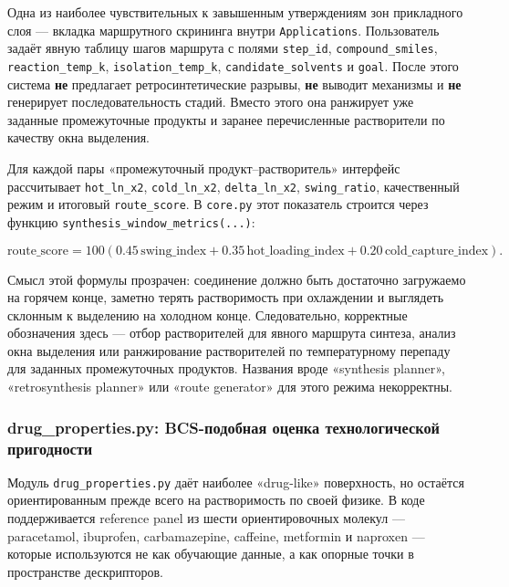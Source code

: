 \documentclass[11pt]{article}
\begin{document}
Одна из наиболее чувствительных к завышенным утверждениям зон прикладного слоя --- вкладка маршрутного скрининга внутри \texttt{Applications}. Пользователь задаёт явную таблицу шагов маршрута с полями \texttt{step\_id}, \texttt{compound\_smiles}, \texttt{reaction\_temp\_k}, \texttt{isolation\_temp\_k}, \texttt{candidate\_solvents} и \texttt{goal}. После этого система \textbf{не} предлагает ретросинтетические разрывы, \textbf{не} выводит механизмы и \textbf{не} генерирует последовательность стадий. Вместо этого она ранжирует уже заданные промежуточные продукты и заранее перечисленные растворители по качеству окна выделения.

Для каждой пары «промежуточный продукт--растворитель» интерфейс рассчитывает \texttt{hot\_ln\_x2}, \texttt{cold\_ln\_x2}, \texttt{delta\_ln\_x2}, \texttt{swing\_ratio}, качественный режим и итоговый \texttt{route\_score}. В \texttt{core.py} этот показатель строится через функцию \texttt{synthesis\_window\_metrics(...)}:

\begin{equation*}
\text{route\_score} = 100\left(0.45\,\text{swing\_index} + 0.35\,\text{hot\_loading\_index} + 0.20\,\text{cold\_capture\_index}\right).
\end{equation*}

Смысл этой формулы прозрачен: соединение должно быть достаточно загружаемо на горячем конце, заметно терять растворимость при охлаждении и выглядеть склонным к выделению на холодном конце. Следовательно, корректные обозначения здесь --- отбор растворителей для явного маршрута синтеза, анализ окна выделения или ранжирование растворителей по температурному перепаду для заданных промежуточных продуктов. Названия вроде «synthesis planner», «retrosynthesis planner» или «route generator» для этого режима некорректны.

\subsubsection{drug\_properties.py: BCS-подобная оценка технологической пригодности}

Модуль \texttt{drug\_properties.py} даёт наиболее «drug-like» поверхность, но остаётся ориентированным прежде всего на растворимость по своей физике. В коде поддерживается reference panel из шести ориентировочных молекул --- paracetamol, ibuprofen, carbamazepine, caffeine, metformin и naproxen --- которые используются не как обучающие данные, а как опорные точки в пространстве дескрипторов.
\end{document}
